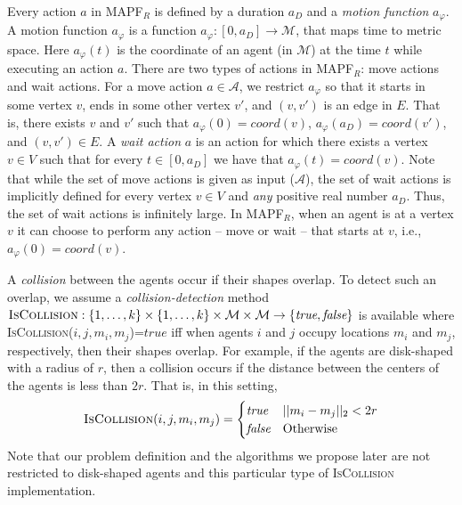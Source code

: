 \documentclass[review]{elsarticle}
\newcommand\roni[1]{\nb{\textbf{Roni:}}{green}{#1}}
\newcommand\dor[1]{\nb{\textbf{Dor:}}{Fuchsia}{#1}}
\newcommand{\mapfr}{\ac{MAPF}$_R$\xspace}
\newcommand{\true}{\textit{true}\xspace}
\newcommand{\false}{\textit{false}\xspace}
\newcommand{\coord}{\textit{coord}\xspace}
\newcommand{\iscollision}{\textsc{IsCollision}\xspace}
\begin{document}
Every action $a$ in \mapfr is defined by a duration $a_D$ and a \emph{motion function} $a_\varphi$. 
A motion function $a_\varphi$ is a function $a_\varphi:[0,a_D]\rightarrow \mathcal{M}$, that maps time to metric space. Here $a_\varphi(t)$ is the coordinate of an agent (in $\mathcal{M}$) at the time $t$ while executing an action $a$.
There are two types of actions in \mapfr: move actions and wait actions. 
For a move action $a\in \mathcal{A}$, we restrict $a_\varphi$ so that it starts in some vertex $v$, 
ends in some other vertex $v'$, and $(v,v')$ is an edge in $E$. 
That is, there exists $v$ and $v'$ such that $a_\varphi(0)=\coord(v)$, $a_\varphi(a_D)=\coord(v')$, and $(v,v')\in E$.
A \emph{wait action} $a$ is an action for which there exists a vertex $v\in V$ such that for every $t\in [0,a_D]$ 
we have that $a_\varphi(t)=\coord(v)$. Note that while the set of move actions is given as input ($\mathcal{A}$), 
the set of wait actions is implicitly defined for every vertex $v\in V$ and \emph{any} positive real number $a_D$. 
Thus, the set of wait actions is infinitely large.
In \mapfr, when an agent is at a vertex $v$ it can choose to perform any action -- move or wait -- that starts at $v$, i.e., $a_\varphi(0)=\coord(v)$. 

A \emph{collision} between the agents occur if their shapes overlap. To detect such an overlap, we assume a \emph{collision-detection} method $\iscollision:\{1,\ldots,k\}\times \{1,\ldots,k\}
\times \mathcal{M}\times \mathcal{M}
\rightarrow \{\true,\false\}$ 
is available where \iscollision($i,j,m_i,m_j$)=$\true$ iff when agents $i$ and $j$ occupy locations $m_i$ and $m_j$, respectively, then their shapes overlap. For example, if the agents are disk-shaped with a radius of $r$, then a collision occurs if the distance between the centers of the agents is less than $2r$. That is, in this setting, 
\begin{equation}
\iscollision(i,j, m_i,m_j)=
\begin{cases}
\true & ||m_i-m_j||_2 < 2r \\
\false & \text{Otherwise}
\end{cases}
\end{equation}
Note that our problem definition and the algorithms we propose later are not restricted to disk-shaped agents and this particular type of \iscollision implementation. 
\end{document}
